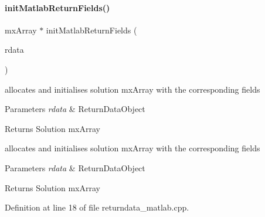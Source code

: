\paragraph{\texorpdfstring{init\+Matlab\+Return\+Fields()}{initMatlabReturnFields()}}
{\footnotesize\ttfamily mx\+Array $\ast$ init\+Matlab\+Return\+Fields (\begin{DoxyParamCaption}\item[{\mbox{\hyperlink{classamici_1_1_return_data}{Return\+Data}} const $\ast$}]{rdata }\end{DoxyParamCaption})}

allocates and initialises solution mx\+Array with the corresponding fields


\begin{DoxyParams}{Parameters}
{\em rdata} & Return\+Data\+Object\\
\hline
\end{DoxyParams}
\begin{DoxyReturn}{Returns}
Solution mx\+Array
\end{DoxyReturn}
allocates and initialises solution mx\+Array with the corresponding fields


\begin{DoxyParams}{Parameters}
{\em rdata} & Return\+Data\+Object\\
\hline
\end{DoxyParams}
\begin{DoxyReturn}{Returns}
Solution mx\+Array
\end{DoxyReturn}


Definition at line 18 of file returndata\+\_\+matlab.\+cpp.


